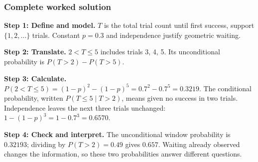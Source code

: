 \subsubsection*{Complete worked solution}
\par\noindent\begin{minipage}{\linewidth}
\textbf{Step 1: Define and model.} $T$ is the total trial count until first success, support $\{1,2,\ldots\}$ trials. Constant $p=0.3$ and independence justify geometric waiting.
\end{minipage}\par\medskip
\par\noindent\begin{minipage}{\linewidth}
\textbf{Step 2: Translate.} $2<T\leq5$ includes trials 3, 4, 5. Its unconditional probability is $P(T>2)-P(T>5)$.
\end{minipage}\par\medskip
\par\noindent\begin{minipage}{\linewidth}
\textbf{Step 3: Calculate.} $P(2<T\leq5)=(1-p)^2-(1-p)^5=0.7^2-0.7^5=0.3219$. The conditional probability, written $P(T\leq5\mid T>2)$, means given no success in two trials. Independence leaves the next three trials unchanged: $1-(1-p)^3=1-0.7^3=0.6570$.
\end{minipage}\par\medskip
\par\noindent\begin{minipage}{\linewidth}
\textbf{Step 4: Check and interpret.} The unconditional window probability is $0.32193$; dividing by $P(T>2)=0.49$ gives $0.657$. Waiting already observed changes the information, so these two probabilities answer different questions.
\end{minipage}\par\medskip
